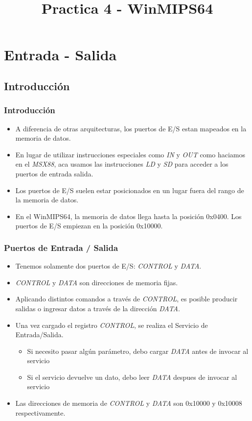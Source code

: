 \documentclass{beamer}
\title{Practica 4 - WinMIPS64}
\begin{document}
\section{Entrada - Salida}

\subsection{Introducción}
\begin{frame}
\frametitle{Introducción}
\begin{itemize}
\item A diferencia de otras arquitecturas, los puertos de E/S estan mapeados en la memoria de datos.
\item En lugar de utilizar instrucciones especiales como \emph{IN} y \emph{OUT} como haciamos en el \emph{MSX88}, aca usamos las instrucciones \emph{LD} y \emph{SD} para acceder a los puertos de entrada salida.
\item Los puertos de E/S suelen estar posicionados en un lugar fuera del rango de la memoria de datos.
\item En el WinMIPS64, la memoria de datos llega hasta la posición 0x0400. Los puertos de E/S empiezan en la posición 0x10000.

\end{itemize}
\end{frame}

\begin{frame}
\frametitle{Puertos de Entrada / Salida}
\begin{itemize}
\item Tenemos solamente dos puertos de E/S:  \emph{CONTROL} y \emph{DATA}.
\item \emph{CONTROL} y \emph{DATA} son direcciones de memoria fijas. 
\item Aplicando distintos comandos a través de \emph{CONTROL}, es posible producir salidas o ingresar datos a través de la dirección \emph{DATA}. 
\item Una vez cargado el registro \emph{CONTROL}, se realiza el Servicio de Entrada/Salida.
\begin{itemize}
\item Si necesito pasar algún parámetro, debo cargar \emph{DATA} antes de invocar al servicio
\item Si el servicio devuelve un dato, debo leer \emph{DATA} despues de invocar al servicio
\end{itemize}
\item Las direcciones de memoria de \emph{CONTROL} y \emph{DATA} son 0x10000 y 0x10008 respectivamente. 
\end{itemize}
\end{frame}
\end{document}
